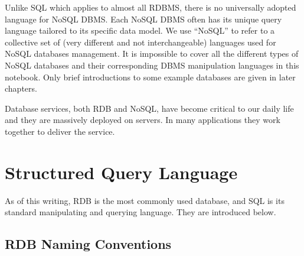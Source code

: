 Unlike SQL which applies to almost all RDBMS, there is no universally adopted language for NoSQL DBMS. Each NoSQL DBMS often has its unique query language tailored to its specific data model. We use ``NoSQL'' to refer to a collective set of (very different and not interchangeable) languages used for NoSQL databases management. It is impossible to cover all the different types of NoSQL databases and their corresponding DBMS manipulation languages in this notebook. Only brief introductions to some example databases are given in later chapters.

Database services, both RDB and NoSQL, have become critical to our daily life and they are massively deployed on servers. In many applications they work together to deliver the service.

\section{Structured Query Language}

As of this writing, RDB is the most commonly used database, and SQL is its standard manipulating and querying language. They are introduced below.

\subsection{RDB Naming Conventions} \label{ch:db:subsec:tables}

